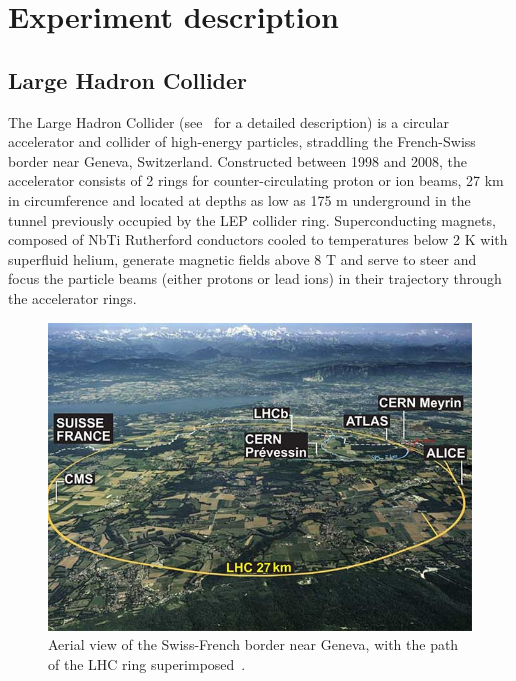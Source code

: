 \chapter{Experiment description\label{sec:experiment}}

\section{Large Hadron Collider\label{sec:lhc}}

The Large Hadron Collider (see~\cite{1748-0221-3-08-S08001} for a detailed description) is a circular accelerator and collider of high-energy particles, straddling the French-Swiss border near Geneva, Switzerland. Constructed between 1998 and 2008, the accelerator consists of 2 rings for counter-circulating proton or ion beams, 27 km in circumference and located at depths as low as 175 m underground in the tunnel previously occupied by the LEP collider ring. Superconducting magnets, composed of NbTi Rutherford conductors cooled to temperatures below 2 K with superfluid helium, generate magnetic fields above 8 T and serve to steer and focus the particle beams (either protons or lead ions) in their trajectory through the accelerator rings.

\begin{figure}[hbtp]
  \begin{center}
    \includegraphics[width=2.0\cmsFigWidth]{figures/lhcring}
    \caption{Aerial view of the Swiss-French border near Geneva, with the path of the LHC ring superimposed~\cite{LHCring}.}
    \label{fig:lhc}
  \end{center}
\end{figure}

